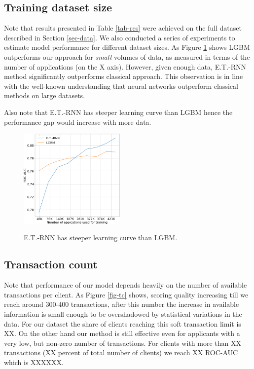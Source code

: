\documentclass[sigconf]{acmart}
\begin{document}
\subsection{Training dataset size}

Note that results presented in Table \ref{tab-res} were achieved on the full dataset described in Section \ref{sec-data}. We also conducted a series of experiments to estimate model performance for different dataset sizes.
As Figure \ref{fig-lc} shows LGBM outperforms our approach for \textit{small} volumes of data, as measured in terms of the number of applications (on the X axis). However, given enough data, E.T.-RNN method significantly outperforms classical approach. This observation is in line with the well-known understanding that neural networks outperform classical methods on large datasets.

Also note that E.T.-RNN has steeper learning curve than LGBM hence the performance gap would increase with more data.

\begin{figure}[ht]
  \caption{E.T.-RNN has steeper learning curve than LGBM.}
  \includegraphics[width=0.46\textwidth]{figures/learning-curve.png}
  \label{fig-lc}
\end{figure}

\subsection{Transaction count}

Note that performance of our model depends heavily on the number of available transactions per client. As Figure \ref{fig-tc} shows, scoring quality increasing till we reach around 300-400 transactions, after this number the increase in available information is small enough to be overshadowed by statistical variations in the data. For our dataset the share of clients reaching this soft transaction limit is XX. On the other hand our method is still effective even for applicants with a very low, but non-zero number of transactions. For clients with more than XX transactions (XX percent of total number of clients) we reach XX ROC-AUC which is XXXXXX. 
\end{document}
